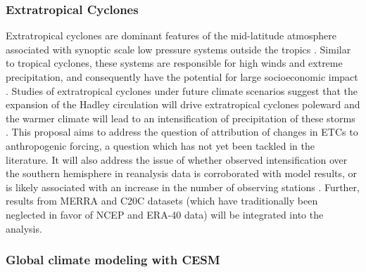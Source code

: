 \documentclass[11pt]{article}
\begin{document}
\subsubsection{Extratropical Cyclones}

Extratropical cyclones are dominant features of the mid-latitude atmosphere associated with synoptic scale low pressure systems outside the tropics \citep{serreze1995climatological}.  Similar to tropical cyclones, these systems are responsible for high winds and extreme precipitation, and consequently have the potential for large socioeconomic impact \citep{ulbrich2009extra}.  Studies of extratropical cyclones under future climate scenarios suggest that the expansion of the Hadley circulation will drive extratropical cyclones poleward \citep{bengtsson2006storm} and the warmer climate will lead to an intensification of precipitation of these storms \citep{bengtsson2009will, zappa2013multi}.  This proposal aims to address the question of attribution of changes in ETCs to anthropogenic forcing, a question which has not yet been tackled in the literature.  It will also address the issue of whether observed intensification over the southern hemisphere in reanalysis data is corroborated with model results, or is likely associated with an increase in the number of observing stations \citep{simmonds2000variability}.  Further, results from MERRA and C20C datasets (which have traditionally been neglected in favor of NCEP and ERA-40 data) will be integrated into the analysis.

\subsubsection{Global climate modeling with CESM}
\end{document}

